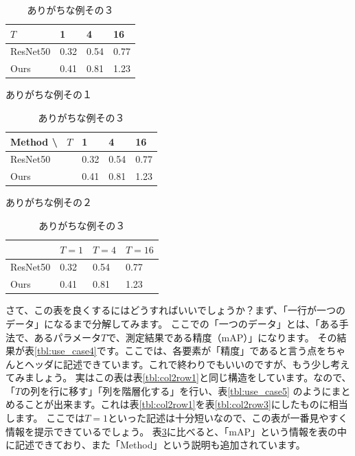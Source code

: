 \documentclass[uplatex,onecolumn,9pt,dvipdfmx]{jsarticle}
\newcommand{\Tref}[1]{表\ref{#1}}
\begin{document}
\begin{table}[h]
    \begin{minipage}{0.32\linewidth}
        \centering
        \begin{tabular}{@{}llll@{}} \toprule
            $T$ & 1 & 4 & 16 \\ \midrule
            ResNet50  & 0.32 & 0.54 & 0.77 \\ 
            Ours      & 0.41 & 0.81 & 1.23 \\ \bottomrule   
        \end{tabular}
        \caption{ありがちな例その１}
        \label{tbl:use_case1}
    \end{minipage}
    \hfill
    \begin{minipage}{0.32\linewidth}
        \centering
        \begin{tabular}{|l|lll|} \hline
            Method \textbackslash ~ $T$ & 1 & 4 & 16 \\ \hline
            ResNet50  & 0.32 & 0.54 & 0.77 \\ 
            Ours      & 0.41 & 0.81 & 1.23 \\ \hline
        \end{tabular}
        \caption{ありがちな例その２}
        \label{tbl:use_case2}
    \end{minipage}
    \hfill
    \begin{minipage}{0.32\linewidth}
        \centering
        \begin{tabular}{@{}llll@{}} \toprule
            & $T=1$ & $T=4$ & $T=16$ \\ \midrule
            ResNet50  & 0.32 & 0.54 & 0.77 \\ 
            Ours      & 0.41 & 0.81 & 1.23 \\ \bottomrule   
        \end{tabular}
        \caption{ありがちな例その３}
        \label{tbl:use_case3}
    \end{minipage}
\end{table}

さて、この表を良くするにはどうすればいいでしょうか？まず、「一行が一つのデータ」になるまで分解してみます。
ここでの「一つのデータ」とは、「ある手法で、あるパラメータ$T$で、測定結果である精度（mAP）」になります。
その結果が\Tref{tbl:use_case4}です。ここでは、各要素が「精度」であると言う点をちゃんとヘッダに記述できています。これで終わりでもいいのですが、もう少し考えてみましょう。
実はこの表は\Tref{tbl:col2row1}と同じ構造をしています。なので、「$T$の列を行に移す」「列を階層化する」を行い、\Tref{tbl:use_case5}
のようにまとめることが出来ます。これは\Tref{tbl:col2row1}を\Tref{tbl:col2row3}にしたものに相当します。
ここでは$T=1$といった記述は十分短いなので、この表が一番見やすく情報を提示できているでしょう。
\Tref{tbl:use_case3}に比べると、「mAP」という情報を表の中に記述できており、また「Method」という説明も追加されています。
\end{document}

